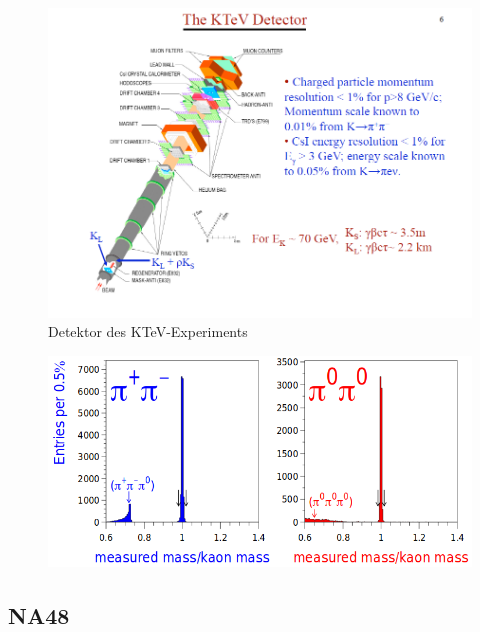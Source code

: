 \documentclass[aspectratio=1610, professionalfonts, 9pt, t]{beamer}
\begin{document}
  \begin{frame}
    \begin{figure}[ht]
      \includegraphics[height=0.9\textheight]{Images/KTEVDETEKTOR.png}
      \caption{Detektor des KTeV-Experiments}
    \end{figure}
  \end{frame}

  \begin{frame}
    \begin{figure}
      \includegraphics[height=0.9\textheight]{Images/ktevdata.png}
    \end{figure}
  \end{frame}

  \subsection{NA48}
\end{document}
